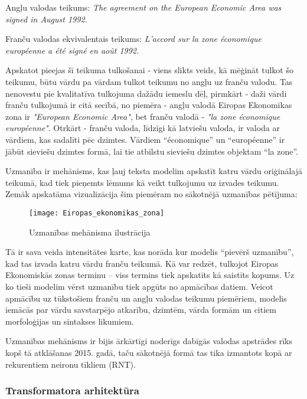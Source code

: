 \noindent Angļu valodas teikums: \textit{The agreement on the European Economic Area was signed in August 1992.}


\noindent Franču valodas ekvivalentais teikums: \textit{L’accord sur la zone économique européenne a été signé en août 1992.}

Apskatot pieejas šī teikuma tulkošanai - viens slikts veids, kā mēģināt tulkot šo teikumu, būtu vārdu pa vārdam tulkot teikumu no angļu uz franču valodu. Tas nenovestu pie kvalitatīva tulkojuma dažādu iemeslu dēļ, pirmkārt - daži vārdi franču tulkojumā ir citā secībā, no piemēra - angļu valodā Eiropas Ekonomikas zona ir \textit{"European Economic Area"}, bet franču valodā - \textit{"la zone économique européenne"}. Otrkārt - franču valoda, līdzīgi kā latviešu valoda, ir valoda ar vārdiem, kas sadalīti pēc dzimtes. Vārdiem “économique” un “européenne” ir jābūt sieviešu dzimtes formā, lai tie atbilstu sieviešu dzimtes objektam “la zone”.

Uzmanība ir mehānisms, kas ļauj teksta modelim apskatīt katru vārdu oriģinālajā teikumā, kad tiek pieņemts lēmums kā veikt tulkojumu uz izvades teikumu. Zemāk apskatāma vizualizācija šim piemēram no sākotnējā uzmanības pētījuma:

\begin{figure}[H]
\texttt{[image: Eiropas\_ekonomikas\_zona]}
\caption{Uzmanības mehānisma ilustrācija \cite{bahdanau2016neural}}
\label{fig:Eiropas_ekonomikas_zona}
\end{figure}

Tā ir sava veida intensitātes karte, kas norāda kur modelis “pievērš uzmanību”, kad tas izvada katru vārdu franču teikumā. Kā var redzēt, tulkojot Eiropas Ekonomiskās zonas terminu – viss termins tiek apskatīts kā saistīts kopums. Uz ko tieši modelim vērst uzmanību tiek apgūts no apmācības datiem. Veicot apmācību uz tūkstošiem franču un angļu valodas teikumu piemēriem, modelis iemācās par vārdu savstarpējo atkarību, dzimtēm, vārda formām un citiem morfoloģijas un sintakses likumiem. 

Uzmanības mehānisms ir bijis ārkārtīgi noderīgs dabīgās valodas apstrādes rīks kopš tā atklāšanas 2015. gadā, taču sākotnējā formā tas tika izmantots kopā ar rekurentiem neironu tīkliem (RNT). 

\subsubsection{Transformatora arhitektūra}

